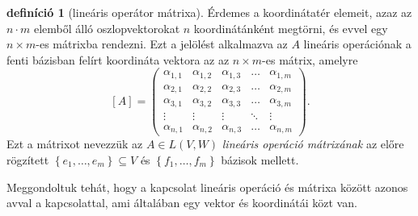 \documentclass[9pt, a4paper, showtrims]{memoir}
\theoremstyle{plain}
\theoremstyle{remark}
\theoremstyle{definition}
\newtheorem{definition}[proposition]{definíció}
\begin{document}
\begin{definition}[lineáris operátor mátrixa]
    Érdemes a koordinátatér elemeit, azaz az $n\cdot m$ elemből álló oszlopvektorokat $n$ koordinátánként megtörni,
    és evvel egy $n\times m$-es mátrixba rendezni.
    Ezt a jelölést alkalmazva az $A$ lineáris operációnak a fenti bázisban felírt koordináta vektora az az 
    $n\times m$-es mátrix,
    amelyre
    \[
        [A]=
        \begin{pmatrix}
            \alpha_{1,1}&\alpha_{1,2}&\alpha_{1,3}&\dots&\alpha_{1,m}\\
            \alpha_{2,1}&\alpha_{2,2}&\alpha_{2,3}&\dots&\alpha_{2,m}\\
            \alpha_{3,1}&\alpha_{3,2}&\alpha_{3,3}&\dots&\alpha_{3,m}\\
            \vdots      &\vdots      &\vdots      &\ddots&\vdots\\
            \alpha_{n,1}&\alpha_{n,2}&\alpha_{n,3}&\dots&\alpha_{n,m}
        \end{pmatrix}.
    \]
    Ezt a mátrixot nevezzük az 
    $A\in L\left( V,W \right)$ \emph{lineáris operáció mátrixának}
    az előre rögzített 
    $\left\{e_1,\dots,e_m  \right\}\subseteq V$ és $\left\{ f_1,\dots,f_m \right\}$ bázisok mellett.
\end{definition}
Meggondoltuk tehát, hogy a kapcsolat lineáris operáció és mátrixa között azonos avval a kapcsolattal,
ami általában egy vektor és koordinátái közt van.
\end{document}
